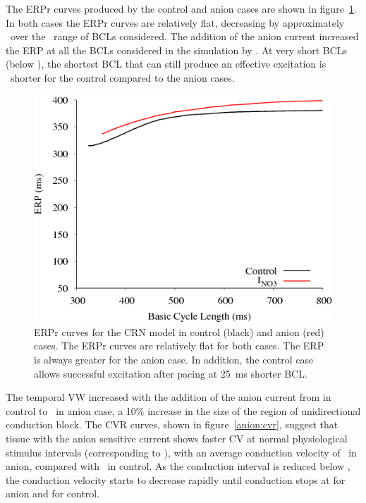The ERPr curves produced by the control and anion cases are shown in
figure~\ref{anion:erpr}.  In both cases the ERPr curves are relatively flat,
decreasing by approximately \ over the \ range of BCLs considered.  The
addition of the anion current increased the ERP at all the BCLs considered in
the simulation by .  At very short BCLs (below ), the shortest BCL
that can still produce an effective excitation is \ shorter for the control
compared to the anion cases.

\begin{figure}
\includegraphics{figures/toolkit/anion/04_ERPR}
\caption[Anion Sensitive Effective Refractory Period Restitution]{
\label{anion:erpr} ERPr curves for the CRN model in control (black) and anion
(red) cases.  The ERPr curves are relatively flat for both cases.  The ERP is
always greater for the anion case.  In addition, the control case allows
successful excitation after pacing at 25~ms shorter BCL.}
\end{figure}

The temporal VW increased with the addition of the anion current from
 in
control to \ in anion case, a 10\% increase in the size of the region of
unidirectional conduction block.  The CVR curves, shown in
figure~\ref{anion:cvr}, suggest that tissue with the anion sensitive current
shows faster CV at normal physiological stimulus intervals (corresponding to
), with an average conduction velocity of
\ in anion, compared with \ in control.  As the conduction
interval is reduced below , the conduction velocity starts to decrease
rapidly until conduction stops at  for anion and  for control.

